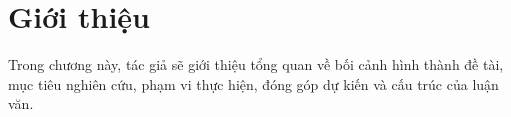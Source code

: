 ﻿\documentclass[12pt]{report}
\begin{document}

\author{Phạm Đại Hoàng An - 2470281}


\beforepreface

\cleardoublepage
{}
\setcounter{page}{1}
\pagestyle{plain}







\afterpreface

\chapter{Giới thiệu}

Trong chương này, tác giả sẽ giới thiệu tổng quan về bối cảnh hình thành đề tài, mục tiêu nghiên cứu, phạm vi thực hiện, đóng góp dự kiến và cấu trúc của luận văn.
\end{document}
